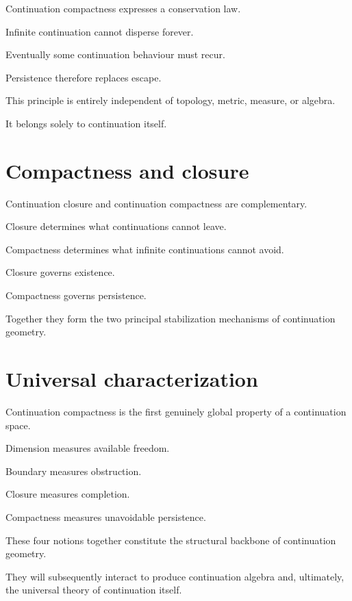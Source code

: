 \documentclass[13pt,openany]{book}
\theoremstyle{plain}
\theoremstyle{definition}
\begin{document}
Continuation compactness expresses a conservation law.

Infinite continuation cannot disperse forever.

Eventually some continuation behaviour must recur.

Persistence therefore replaces escape.

This principle is entirely independent of topology, metric, measure, or
algebra.

It belongs solely to continuation itself.

\section{Compactness and closure}

Continuation closure and continuation compactness are complementary.

Closure determines what continuations cannot leave.

Compactness determines what infinite continuations cannot avoid.

Closure governs existence.

Compactness governs persistence.

Together they form the two principal stabilization mechanisms of continuation
geometry.

\section{Universal characterization}

Continuation compactness is the first genuinely global property of a
continuation space.

Dimension measures available freedom.

Boundary measures obstruction.

Closure measures completion.

Compactness measures unavoidable persistence.

These four notions together constitute the structural backbone of continuation
geometry.

They will subsequently interact to produce continuation algebra and, ultimately,
the universal theory of continuation itself.
\end{document}
